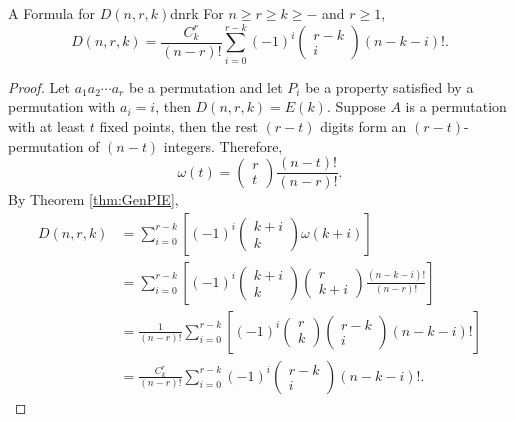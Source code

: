 \documentclass[math]{amznotes}
\theoremstyle{remark}
\begin{document}
\begin{thmbox}{A Formula for $D(n, r, k)$}{dnrk}
    For $n \geq r \geq k \geq -$ and $r \geq 1$,
    \begin{equation*}
        D(n, r, k) = \frac{C^r_k}{(n - r)!}\sum_{i = 0}^{r - k}(-1)^i \begin{pmatrix}
            r - k \\
            i
        \end{pmatrix}(n - k - i)!.
    \end{equation*}
    \tcblower
    \begin{proof}
        Let $a_1a_2\cdots a_r$ be a permutation and let $P_i$ be a property satisfied by a permutation with $a_i = i$, then $D(n, r, k) = E(k)$. Suppose $A$ is a permutation with at least $t$ fixed points, then the rest $(r - t)$ digits form an $(r - t)$-permutation of $(n - t)$ integers. Therefore, 
        \begin{equation*}
            \omega(t) = \begin{pmatrix}
                r \\
                t
            \end{pmatrix}\frac{(n - t)!}{(n - r)!}.
        \end{equation*}
        By Theorem \ref{thm:GenPIE},
        \begin{align*}
            D(n, r, k) & = \sum_{i = 0}^{r - k}\left[(-1)^i\begin{pmatrix}
                k + i \\
                k
            \end{pmatrix}\omega(k + i)\right] \\
            & = \sum_{i = 0}^{r - k}\left[(-1)^i\begin{pmatrix}
                k + i \\
                k
            \end{pmatrix}\begin{pmatrix}
                r \\
                k + i
            \end{pmatrix}\frac{(n - k - i)!}{(n - r)!}\right] \\
            & = \frac{1}{(n - r)!}\sum_{i = 0}^{r - k}\left[(-1)^i\begin{pmatrix}
                r \\
                k
            \end{pmatrix}\begin{pmatrix}
                r - k \\
                i
            \end{pmatrix}(n - k - i)!\right] \\
            & = \frac{C^r_k}{(n - r)!}\sum_{i = 0}^{r - k}(-1)^i \begin{pmatrix}
                r - k \\
                i
            \end{pmatrix}(n - k - i)!.
        \end{align*}
    \end{proof}
\end{thmbox}
\end{document}
